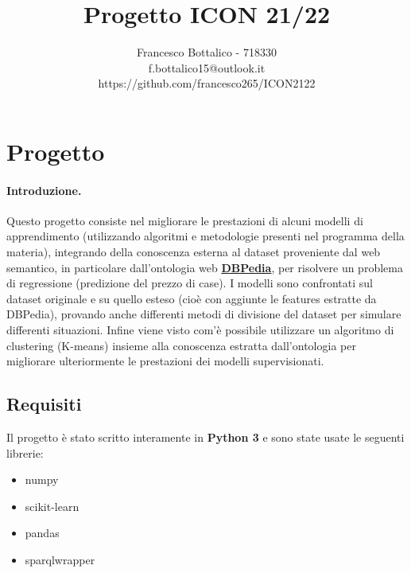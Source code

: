 \documentclass{article}
\title{Progetto ICON 21/22}
\author{Francesco Bottalico - 718330 \\
		f.bottalico15@outlook.it \\
		https://github.com/francesco265/ICON2122}
\date{}
\begin{document}
\maketitle
\tableofcontents

\section{Progetto}
\paragraph{Introduzione.}
Questo progetto consiste nel migliorare le prestazioni di alcuni modelli di
apprendimento (utilizzando algoritmi e metodologie presenti nel programma della
materia), integrando della conoscenza esterna al dataset proveniente dal web
semantico, in particolare dall'ontologia web \href{http://dbpedia.org}{\textbf{
DBPedia}}, per risolvere un problema di regressione (predizione del prezzo di 
case). I modelli sono confrontati sul dataset originale e su quello esteso
(cioè con aggiunte le features estratte da DBPedia), provando anche differenti
metodi di divisione del dataset per simulare differenti situazioni.
Infine viene visto com'è possibile utilizzare un algoritmo di clustering
(K-means) insieme alla conoscenza estratta dall'ontologia per
migliorare ulteriormente le prestazioni dei modelli supervisionati.


\subsection{Requisiti}
Il progetto è stato scritto interamente in \textbf{Python 3} e sono state usate
le seguenti librerie:
\begin{itemize}
	\itemsep0em
	\item numpy
	\item scikit-learn
	\item pandas
	\item sparqlwrapper
\end{itemize}
\end{document}
